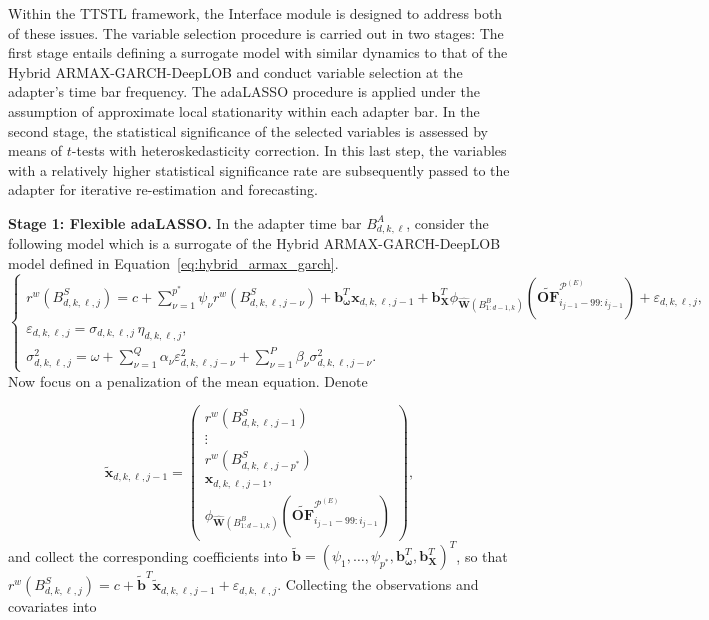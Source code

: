 \documentclass{rQUF2e}
\theoremstyle{plain}
\theoremstyle{definition}
\theoremstyle{remark}
\begin{document}
Within the TTSTL framework, the Interface module is designed to address both of these issues. The variable selection procedure is carried out in two stages: The first stage entails defining a surrogate model with similar dynamics to that of the Hybrid ARMAX-GARCH-DeepLOB and conduct variable selection at the adapter's time bar frequency. The adaLASSO procedure is applied under the assumption of approximate local stationarity within each adapter bar. In the second stage, the statistical significance of the selected variables is assessed by means of \(t\)-tests with heteroskedasticity correction. In this last step, the variables with a relatively higher statistical significance rate are subsequently passed to the adapter for iterative re-estimation and forecasting.
\medskip

\noindent\textbf{Stage 1: Flexible adaLASSO.}  In the adapter time bar $B^A_{d, k, \ell}$, consider the following model which is a surrogate of the Hybrid ARMAX-GARCH-DeepLOB model defined in Equation~\eqref{eq:hybrid_armax_garch}.
\begin{equation}
    \begin{cases}
        r^w\left( B^S_{d, k, \ell, j} \right) = c + \sum^{p^*}_{\nu = 1} \psi_{\nu} r^w \left( B^S_{d, k, \ell, j - \nu} \right) + \mathbf{b}_{\boldsymbol{\omega}}^T \mathbf{x}_{d, k, \ell, j - 1} + \mathbf{b}^T_{\mathbf{X}}\phi_{\hat{\mathbf{W}}\left( B^B_{1:d - 1, k} \right)} \left( \widetilde{\mathbf{OF}}^{\mathcal{P}^{(E)}}_{i_{j - 1} - 99:i_{j - 1}} \right) + \varepsilon_{d, k, \ell, j}, \\[6pt]
        \varepsilon_{d, k, \ell, j} = \sigma_{d, k, \ell, j} \,\eta_{d, k, \ell, j},\\[6pt]
        \sigma_{d, k, \ell, j}^2 = \omega + \sum^{Q}_{\nu = 1} \alpha_{\nu} \varepsilon^2_{d, k, \ell, j - \nu} + \sum^P_{\nu = 1} \beta_{\nu} \sigma_{d, k, \ell, j - \nu}^2.
    \end{cases}
    \label{eq:surrogate}
\end{equation}
Now focus on a penalization of the mean equation.  Denote

\[
    \tilde{\mathbf{x}}_{d,k,\ell,j - 1}
    =
    \begin{pmatrix}
        r^w \left( B^S_{d, k, \ell, j - 1} \right)   \\
        \vdots                                       \\
        r^w \left( B^S_{d, k, \ell, j - p^*} \right) \\
        \mathbf{x}_{d, k, \ell, j - 1},              \\
        \phi_{\hat{\mathbf{W}}\left( B^B_{1:d - 1, k} \right)}\left( \widetilde{\mathbf{OF}}^{\mathcal{P}^{(E)}}_{i_{j - 1} - 99:i_{j - 1}} \right)
    \end{pmatrix},
\]
and collect the corresponding coefficients into \(\tilde{\mathbf{b}} = \left( \psi_1, \dots, \psi_{p^*}, \mathbf{b}^T_{\boldsymbol{\omega}}, \mathbf{b}^T_{\mathbf{X}}\right)^T\), so that \(r^w\left( B^S_{d,k,\ell,j} \right) = c + \tilde{\mathbf{b}}^T\tilde{\mathbf{x}}_{d, k, \ell, j - 1} + \varepsilon_{d,k,\ell, j}\). Collecting the observations and covariates into
\end{document}
